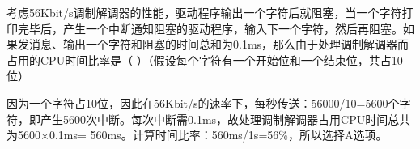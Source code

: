 \question 考虑56Kbit/s调制解调器的性能，驱动程序输出一个字符后就阻塞，当一个字符打印完毕后，产生一个中断通知阻塞的驱动程序，输入下一个字符，然后再阻塞。如果发消息、输出一个字符和阻塞的时间总和为0.1ms，那么由于处理调制解调器而占用的CPU时间比率是（
）（假设每个字符有一个开始位和一个结束位，共占10位）
\par{}
\begin{solution}因为一个字符占10位，因此在56Kbit/s的速率下，每秒传送：56000/10=5600个字符，即产生5600次中断。每次中断需0.1ms，故处理调制解调器占用CPU时间总共为5600×0.1ms=
560ms。计算时间比率：560ms/1s=56\%，所以选择A选项。
\end{solution}
